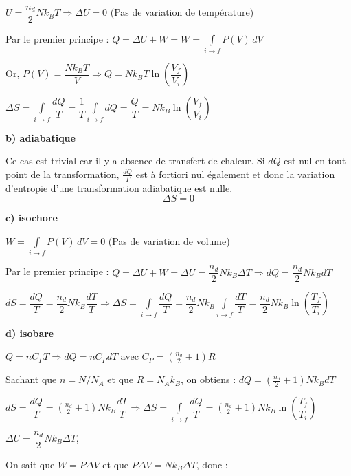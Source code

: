 \documentclass	[11pt, a4paper, openany]{book}
\begin{document}
		$ U = \dfrac{n_d}{2}Nk_BT \Rightarrow \Delta U = 0$ (Pas de variation de température)
				
		Par le premier principe : $ Q = \Delta U + W = W = \int  \limits_{i \to f} P(V)\,dV$
				
		Or, $ P(V) = \dfrac{Nk_BT}{V} \Rightarrow Q = Nk_BT\ln \left(\dfrac{V_f}{V_i}\right)$
				
		$ \Delta S = \int \limits_{i \to f} \dfrac{dQ}{T} = \dfrac{1}{T} \int \limits_{i \to f} dQ = \dfrac{Q}{T} = Nk_B\ln \left(\dfrac{V_f}{V_i}\right)$
			
		\textbf{b) adiabatique}
				
		Ce cas est trivial car il y a absence de transfert de chaleur. Si $dQ$ est nul en tout point de la transformation, $\frac{dQ}{T}$ est à fortiori nul également et donc la variation d'entropie d'une transformation adiabatique est nulle. $$\Delta S = 0$$
				
		\textbf{c) isochore}
			
		$W = \int  \limits_{i \to f} P(V)\,dV = 0$ (Pas de variation de volume)
				
		Par le premier principe : $ Q = \Delta U + W = \Delta U = \dfrac{n_d}{2}Nk_B\Delta T \Rightarrow dQ = \dfrac{n_d}{2}Nk_BdT $
				
		$ dS = \dfrac{dQ}{T} = \dfrac{n_d}{2}Nk_B\dfrac{dT}{T} \Rightarrow \Delta S = \int \limits_{i \to f} \dfrac{dQ}{T} = \dfrac{n_d}{2}Nk_B \int \limits_{i \to f} \dfrac{dT}{T} = \dfrac{n_d}{2}Nk_B\ln \left(\dfrac{T_f}{T_i}\right)$
				
		\textbf{d) isobare}
				
		$ Q = nC_PT \Rightarrow dQ = nC_PdT$ avec $ C_P = (\frac{n_d}{2}+1)R$
				
		Sachant que $n = N/N_A$ et que $R = N_Ak_B$, on obtiens : $dQ = (\frac{n_d}{2}+1)Nk_BdT $
				
		$dS = \dfrac{dQ}{T} = (\frac{n_d}{2}+1)Nk_B\dfrac{dT}{T} \Rightarrow \Delta S = \int \limits_{i \to f} \dfrac{dQ}{T} = (\frac{n_d}{2}+1)Nk_B\ln \left(\dfrac{T_f}{T_i}\right)$
		
		\vspace{0,5cm}
		
				
		$\Delta U = \dfrac{n_d}{2}Nk_B\Delta T $,
				
		On sait que $W = P\Delta V$ et que $ P\Delta V = Nk_B\Delta T$, donc :
				
\end{document}
